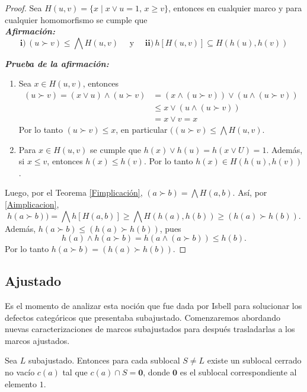 \begin{proof}
    Sea $H(u, v)=\{x\mid x\vee u=1,\, x\geq v\}$, entonces en cualquier marco y para cualquier homomorfismo se cumple que\\

    \noindent
    \emph{\textbf{Afirmación:}}
    \begin{equation}\label{Aimplicacion}
    \mathbf{ i) }\,(u\succ v)\leq \bigwedge H(u, v)\quad \mbox{ y }\quad \mathbf{ ii) }\,h[H(u, v)]\subseteq H(h(u), h(v))
    \end{equation}

    \noindent
    \emph{\textbf{Prueba de la afirmación:}} 
    \begin{enumerate}[$i)$]
        \item Sea $x\in H(u, v)$, entonces 
    \[
    \begin{split}
    (u\succ v)=(x\vee u)\wedge (u\succ v) & =(x\wedge (u\succ v))\vee (u\wedge (u\succ v))\\
    & \leq x\vee (u\wedge (u\succ v))\\
    & =x\vee v=x
    \end{split}
    \]
    Por lo tanto $(u\succ v)\leq x$, en particular $((u\succ v)\leq \bigwedge H(u, v)$.
    \item Para $x\in H(u, v)$ se cumple que $h(x)\vee h(u)=h(x\vee U)=1$. Además, si $x\leq v$, entonces $h(x)\leq h(v)$. Por lo tanto $h(x)\in H(h(u), h(v))$.
    \end{enumerate}
    Luego, por el Teorema \ref{Fimplicación}, $(a\succ b)=\bigwedge H(a, b)$. Así, por \ref{Aimplicacion},
    \[
    h(a\succ b))=\bigwedge h[H(a, b)]\geq \bigwedge H(h(a), h(b))\geq (h(a)\succ h(b)).
    \]
    Además, $h(a\succ b)\leq (h(a)\succ h(b))$, pues 
    \[
    h(a)\wedge h(a\succ b)=h(a\wedge (a\succ b))\leq h(b).
    \]
    Por lo tanto $h(a\succ b)=(h(a)\succ h(b))$.
\end{proof}

\subsection{Ajustado}

Es el momento de analizar esta noción que fue dada por Isbell para solucionar los defectos categóricos que presentaba subajustado. Comenzaremos abordando nuevas caracterizaciones de marcos subajustados para después trasladarlas a los marcos ajustados.

\begin{prop}\label{Cerradosaju}
    Sea $L$ subajustado. Entonces para cada sublocal $S\neq L$ existe un sublocal cerrado no vacío $c(a)$ tal que $c(a)\cap S=\mathbf{0}$, donde $\mathbf{0}$ es el sublocal correspondiente al elemento $1$.
\end{prop}

